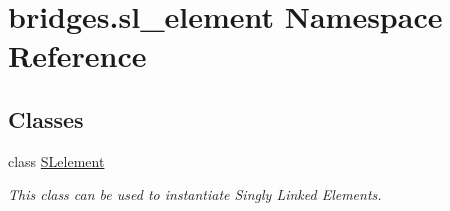 \hypertarget{namespacebridges_1_1sl__element}{}\section{bridges.\+sl\+\_\+element Namespace Reference}
\label{namespacebridges_1_1sl__element}
\subsection*{Classes}
\begin{DoxyCompactItemize}
\item 
class \hyperlink{classbridges_1_1sl__element_1_1_s_lelement}{S\+Lelement}
\begin{DoxyCompactList}\small\item\em This class can be used to instantiate Singly Linked Elements. \end{DoxyCompactList}\end{DoxyCompactItemize}
